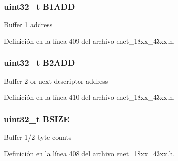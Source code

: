 \subsubsection[{\texorpdfstring{B1\+A\+DD}{B1ADD}}]{ uint32\+\_\+t B1\+A\+DD}\hypertarget{struct_e_n_e_t___t_x_d_e_s_c___t_a9b99a80d13d854bce5c3f9646964c34e}{}\label{struct_e_n_e_t___t_x_d_e_s_c___t_a9b99a80d13d854bce5c3f9646964c34e}
Buffer 1 address 

Definición en la línea 409 del archivo enet\+\_\+18xx\+\_\+43xx.\+h.

\subsubsection[{\texorpdfstring{B2\+A\+DD}{B2ADD}}]{ uint32\+\_\+t B2\+A\+DD}\hypertarget{struct_e_n_e_t___t_x_d_e_s_c___t_a3cf5d995cea5c3b42b9224871c5b18a1}{}\label{struct_e_n_e_t___t_x_d_e_s_c___t_a3cf5d995cea5c3b42b9224871c5b18a1}
Buffer 2 or next descriptor address 

Definición en la línea 410 del archivo enet\+\_\+18xx\+\_\+43xx.\+h.

\subsubsection[{\texorpdfstring{B\+S\+I\+ZE}{BSIZE}}]{ uint32\+\_\+t B\+S\+I\+ZE}\hypertarget{struct_e_n_e_t___t_x_d_e_s_c___t_af2098998d1719cc4a2e9ba78fb835a90}{}\label{struct_e_n_e_t___t_x_d_e_s_c___t_af2098998d1719cc4a2e9ba78fb835a90}
Buffer 1/2 byte counts 

Definición en la línea 408 del archivo enet\+\_\+18xx\+\_\+43xx.\+h.

